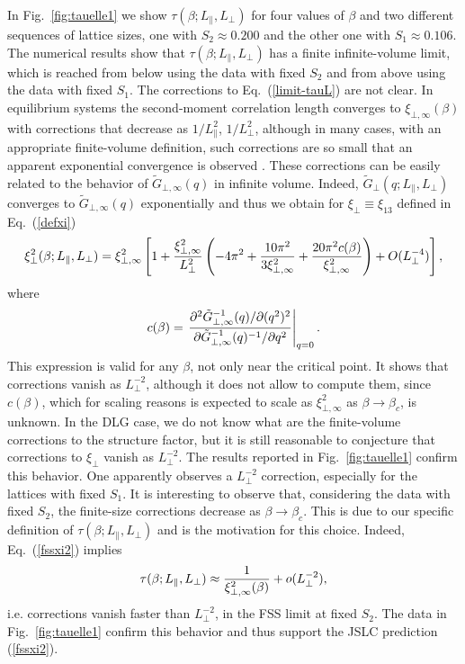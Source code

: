 \documentclass[12pt]{article}
\begin{document}
In Fig.~\ref{fig:tauelle1} we show $\tau(\beta;L_\|,L_\bot)$ for four values of 
$\beta$ and two different sequences of lattice sizes, one with 
$S_2\approx 0.200$ and the other one with $S_1 \approx 0.106$. The numerical 
results show that $\tau(\beta;L_\|,L_\bot)$ has a finite 
infinite-volume limit, which is reached from below 
using the data with fixed $S_2$ and from above using the data with fixed $S_1$.
The corrections to Eq.~(\ref{limit-tauL}) are not clear. 
In equilibrium systems the second-moment correlation length converges 
to $\xi_{\bot,\infty}(\beta)$ with corrections that decrease as $1/L_\|^2$, 
$1/L_\bot^2$, although in many cases, with an appropriate finite-volume 
definition, such corrections are so small that an apparent exponential 
convergence is observed \cite{CP-98}. 
These corrections can be easily related to the behavior of 
$\tilde{G}_{\bot,\infty}(q)$ in infinite volume. 
Indeed, $\tilde{G}_{\bot}(q;L_\|,L_\bot)$ converges to 
$\tilde{G}_{\bot,\infty}(q)$ exponentially and thus 
we obtain for $\xi_\bot \equiv \xi_{13}$ defined in Eq.~(\ref{defxi})
\begin{equation}
\xi_\bot^2(\beta;L_\|,L_\bot) = \xi_{\bot,\infty}^2\left[
1 + {\xi_{\bot,\infty}^2\over L_\bot^2} 
   \left(-4 \pi^2 + {10 \pi^2\over 3 \xi_{\bot,\infty}^2} + 
       {20 \pi^2 c(\beta)\over \xi_{\bot,\infty}^2} \right) + 
    O(L_\bot^{-4})\right],
\end{equation}
where 
\begin{equation}
c(\beta) = \left. {\partial^2 \tilde{G}^{-1}_{\bot,\infty}(q)/\partial (q^2)^2 
               \over 
                   \partial \tilde{G}^{-1}_{\bot,\infty}(q)^{-1}/\partial q^2} 
         \right|_{q=0}.
\end{equation}
This expression is valid for any $\beta$, not only near the critical point.
It shows that corrections vanish as $L_\bot^{-2}$,
although it does not allow to compute them, since $c(\beta)$, 
which for scaling reasons is expected to scale as $\xi_{\bot,\infty}^2$ as 
$\beta\to\beta_c$, is unknown. In the DLG case, we do not know what are 
the finite-volume corrections to the structure factor, but it is still 
reasonable to conjecture that corrections to $\xi_\bot$ 
vanish as $L_\bot^{-2}$. The results reported in Fig.~\ref{fig:tauelle1}
confirm this behavior. One apparently
observes a $L_\bot^{-2}$ correction, especially for the lattices with 
fixed $S_1$. 
It is interesting to observe that, considering the data with 
fixed $S_2$,  the finite-size corrections decrease as $\beta\to \beta_c$. 
This is due to our specific definition of $\tau(\beta;L_\|,L_\bot)$ 
and is the motivation for this choice. Indeed, Eq.~(\ref{fssxi2}) implies
\begin{equation}
\tau(\beta;L_\|,L_\bot) \approx {1\over \xi_{\bot,\infty}^2(\beta)} + 
   o(L_\bot^{-2}),
\label{tauL-correzioni}
\end{equation}
i.e. corrections vanish faster than $L_\bot^{-2}$, in the FSS limit 
at fixed $S_2$. The data in Fig.~\ref{fig:tauelle1} confirm this behavior
and thus support the JSLC prediction (\ref{fssxi2}).
\end{document}
